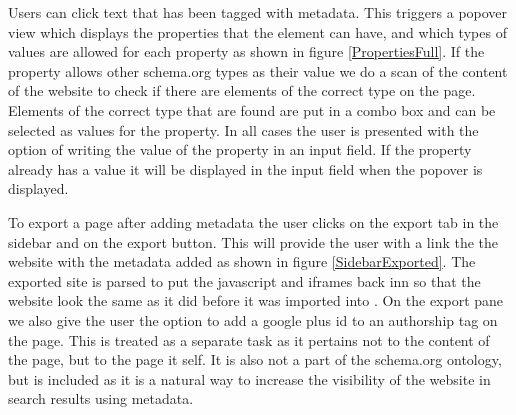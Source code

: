 Users can click text that has been tagged with metadata.
This triggers a popover view which displays the properties that the element can have,
and which types of values are allowed for each property as shown in figure \ref{PropertiesFull}.
If the property allows other schema.org types as their value we do a scan of the content of the website to check if
there are elements of the correct type on the page.
Elements of the correct type that are found are put in a combo box and can be selected as values for the property.
In all cases the user is presented with the option of writing the value of the property in an input field.
If the property already has a value it will be displayed in the input field when the popover is displayed.

To export a page after adding metadata the user clicks on the export tab in the sidebar and on the export button.
This will provide the user with a link the the website with the metadata added as shown in figure \ref{SidebarExported}.
The exported site is parsed to put the javascript and iframes back inn so that the website look the same as it did
before it was imported into \theartefact.
On the export pane we also give the user the option to add a google plus id to an authorship tag on the page.
This is treated as a separate task as it pertains not to the content of the page, but to the page it self.
It is also not a part of the schema.org ontology, but is included as it is a natural way to increase the visibility of
the website in search results using metadata.




